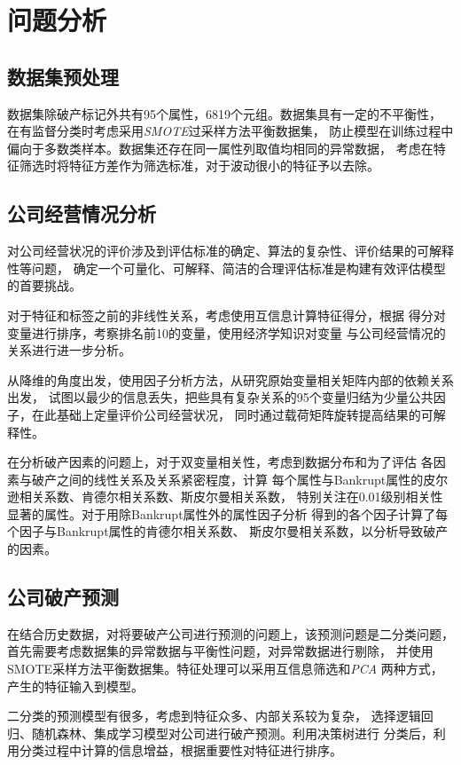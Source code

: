 \section{问题分析}
\subsection{数据集预处理}
\par 数据集除破产标记外共有95个属性，6819个元组。数据集具有一定的不平衡性，
在有监督分类时考虑采用\textit{SMOTE}过采样方法平衡数据集，
防止模型在训练过程中偏向于多数类样本。数据集还存在同一属性列取值均相同的异常数据，
考虑在特征筛选时将特征方差作为筛选标准，对于波动很小的特征予以去除。
\subsection{公司经营情况分析}
\par 对公司经营状况的评价涉及到评估标准的确定、算法的复杂性、评价结果的可解释性等问题，
确定一个可量化、可解释、简洁的合理评估标准是构建有效评估模型的首要挑战。
\par 对于特征和标签之前的非线性关系，考虑使用互信息计算特征得分，根据
得分对变量进行排序，考察排名前10的变量，使用经济学知识对变量
与公司经营情况的关系进行进一步分析。
\par 从降维的角度出发，使用因子分析方法，从研究原始变量相关矩阵内部的依赖关系出发，
试图以最少的信息丢失，把些具有复杂关系的95个变量归结为少量公共因子，在此基础上定量评价公司经营状况，
同时通过载荷矩阵旋转提高结果的可解释性。
\par 在分析破产因素的问题上，对于双变量相关性，考虑到数据分布和为了评估
各因素与破产之间的线性关系及关系紧密程度，计算
每个属性与Bankrupt属性的皮尔逊相关系数、肯德尔相关系数、斯皮尔曼相关系数，
特别关注在0.01级别相关性显著的属性。对于用除Bankrupt属性外的属性因子分析
得到的各个因子计算了每个因子与Bankrupt属性的肯德尔相关系数、
斯皮尔曼相关系数，以分析导致破产的因素。
\subsection{公司破产预测}
在结合历史数据，对将要破产公司进行预测的问题上，该预测问题是二分类问题，
首先需要考虑数据集的异常数据与平衡性问题，对异常数据进行剔除，
并使用SMOTE采样方法平衡数据集。特征处理可以采用互信息筛选和\textit{PCA}
两种方式，产生的特征输入到模型。
\par 二分类的预测模型有很多，考虑到特征众多、内部关系较为复杂，
选择逻辑回归、随机森林、集成学习模型对公司进行破产预测。利用决策树进行
分类后，利用分类过程中计算的信息增益，根据重要性对特征进行排序。